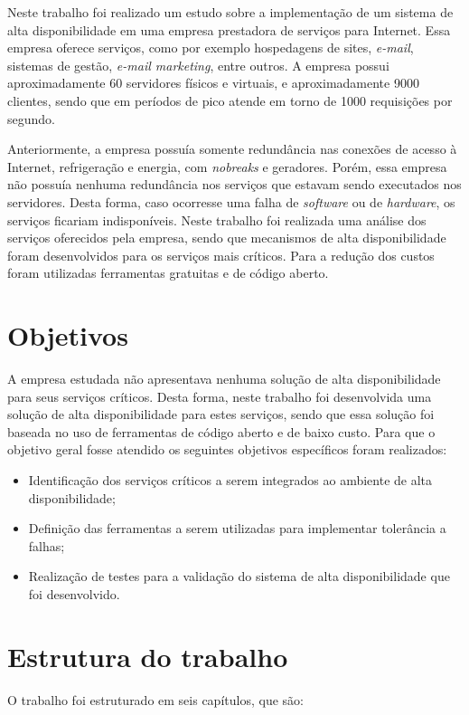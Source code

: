 Neste trabalho foi realizado um estudo sobre a implementação de um sistema de alta disponibilidade em uma empresa prestadora de serviços para 
Internet. Essa empresa oferece serviços, como por exemplo hospedagens de sites, \textit{e-mail}, sistemas de gestão, \textit{e-mail marketing}, 
entre outros. A empresa possui aproximadamente 60 servidores físicos e virtuais, e aproximadamente 9000 clientes, 
sendo que em períodos de pico atende em torno de 1000 requisições por segundo. 

Anteriormente, a empresa possuía somente redundância nas conexões de acesso à Internet, refrigeração e energia, com \textit{nobreaks} e geradores. 
Porém, essa empresa não possuía nenhuma redundância nos serviços que estavam sendo executados nos servidores. Desta forma, caso ocorresse
uma falha de \textit{software} ou de \textit{hardware}, os serviços ficariam indisponíveis. Neste trabalho foi realizada uma análise dos 
serviços oferecidos pela empresa, sendo que mecanismos de alta disponibilidade foram desenvolvidos para os serviços mais críticos. 
Para a redução dos custos foram utilizadas ferramentas gratuitas e de código aberto.

\section{Objetivos}
A empresa estudada não apresentava nenhuma solução de alta disponibilidade para seus serviços críticos. Desta forma, neste trabalho 
foi desenvolvida uma solução de alta disponibilidade para estes serviços, sendo que essa solução foi baseada no uso de ferramentas de 
código aberto e de baixo custo. Para que o objetivo geral fosse atendido os seguintes objetivos específicos foram realizados:

\begin{itemize}
\item Identificação dos serviços críticos a serem integrados ao ambiente de alta disponibilidade;
\item Definição das ferramentas a serem utilizadas para implementar tolerância a falhas;
\item Realização de testes para a validação do sistema de alta disponibilidade que foi desenvolvido.
\end{itemize}

\section{Estrutura do trabalho}
O trabalho foi estruturado em seis capítulos, que são:

